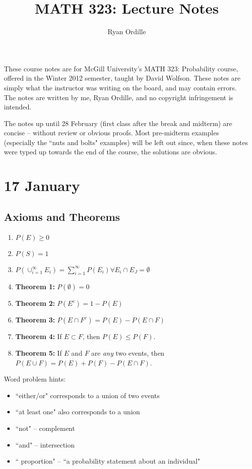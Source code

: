 \documentclass[12pt]{article}
\title{MATH 323: Lecture Notes}
\author{Ryan Ordille}
\begin{document}
\maketitle

These course notes are for McGill University's MATH 323: Probability course, offered in the Winter 2012 semester, taught by David Wolfson. These notes are simply what the instructor was writing on the board, and may contain errors. The notes are written by me, Ryan Ordille, and no copyright infringement is intended. 

The notes up until 28 February (first class after the break and midterm) are concise -- without review or obvious proofs. Most pre-midterm examples (especially the ``nuts and bolts" examples) will be left out since, when these notes were typed up towards the end of the course, the solutions are obvious.

\section{17 January}
\subsection{Axioms and Theorems}
\begin{enumerate}
	\item $P(E) \geq 0$
	\item $P(S) = 1$
	\item $P(\cup_{i=1}^{\infty} E_i) = \sum_{i=1}^{\infty} P(E_i) \forall E_i \cap E_J = \emptyset$
	\item \textbf{Theorem 1:} $P(\emptyset) = 0$
	\item \textbf{Theorem 2:} $P(E^c) = 1 - P(E)$
	\item \textbf{Theorem 3:} $P(E \cap F^c) = P(E) - P(E \cap F)$
	\item \textbf{Theorem 4:} If $E \subset F$, then $P(E) \leq P(F)$.
	\item \textbf{Theorem 5:} If $E$ and $F$ are \emph{any} two events, then $P(E \cup F) = P(E) + P(F) - P(E \cap F)$.
\end{enumerate}

Word problem hints:
\begin{itemize}
	\item ``either/or" corresponds to a union of two events
	\item ``at least one" also corresponds to a union
	\item ``not" -- complement
	\item ``and" -- intersection
	\item `` proportion" -- ``a probability statement about an individual"
\end{itemize}
\end{document}
